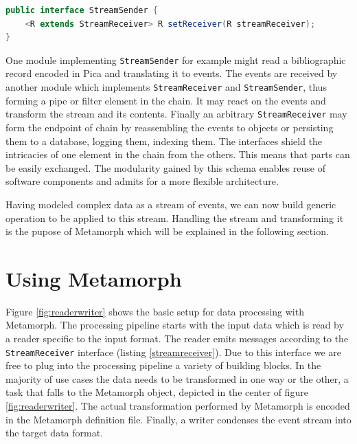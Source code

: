 \documentclass[12pt,a4paper]{article}
\begin{document}
\begin{lstlisting}[float=htb, label=streamsender,caption={The interface of an event stream sender. By virtue of the template R we can efficiently define processing chains via method chaining. See listing \ref{codepipeline2} for examples.}, language=Java]
public interface StreamSender {
	<R extends StreamReceiver> R setReceiver(R streamReceiver);
}
\end{lstlisting}

One module implementing {\tt StreamSender} for example might read a bibliographic record encoded in Pica and translating it to events. 
The events are received by another module which implements {\tt StreamReceiver} and {\tt StreamSender}, thus forming a pipe or filter element in the chain. 
It may react on the events and transform the stream and its contents. Finally an arbitrary {\tt StreamReceiver} may form the endpoint of chain by reassembling the events to objects or persisting them to a database, logging them, indexing them. The interfaces shield the intricacies of one element in the chain from the others. This means that parts can be easily exchanged. The modularity gained by this schema enables reuse of software components and admits for a more flexible architecture.

Having modeled complex data as a stream of events, we can now build generic operation to be applied to this stream. Handling the stream and transforming it is the pupose of Metamorph which will be explained in the following section.




\section{Using Metamorph}

Figure \ref{fig:readerwriter} shows the basic setup for data processing with Metamorph. The processing pipeline starts with the input data which is read by a reader specific to the input format. The reader emits messages according to the {\tt StreamReceiver} interface (listing \ref{streamreceiver}). Due to this interface we are free to plug into the processing pipeline a variety of building blocks. In the majority of use cases the data needs to be transformed in one way or the other, a task that falls to the Metamorph object, depicted in the center of figure  \ref{fig:readerwriter}. The actual transformation performed by Metamorph is encoded in the Metamorph definition file. Finally, a writer condenses the event stream into the target data format.
\end{document}

